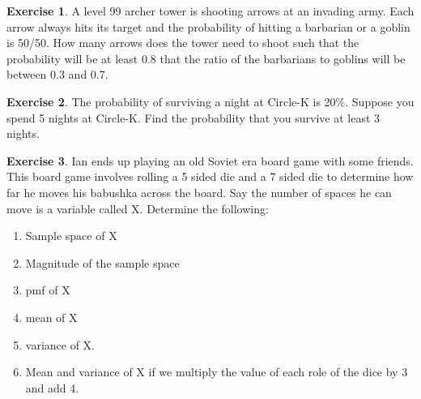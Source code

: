 \documentclass[12pt]{amsart}
\theoremstyle{definition}
\newtheorem{exercise}{Exercise}
\numberwithin{equation}{section}
\theoremstyle{plain}
\begin{document}
\begin{exercise}
A level 99 archer tower is shooting arrows at an invading army. Each arrow always hits its target and the probability of hitting a barbarian or a goblin is 50/50. How many arrows does the tower need to shoot such that the probability will be at least 0.8 that the ratio of the barbarians to goblins will be between 0.3 and 0.7.
\end{exercise}

\begin{exercise}
The probability of surviving a night at Circle-K is 20\%. Suppose you spend 5 nights at Circle-K. Find the probability that you survive at least 3 nights.
\end{exercise}

\begin{exercise}
Ian ends up playing an old Soviet era board game with some friends. This board game involves rolling a 5 sided die and a 7 sided die to determine how far he moves his babushka across the board. Say the number of spaces he can move is a variable called X. Determine the following: 
\begin{enumerate}[label=\Alph*.]
\item Sample space of X
\item Magnitude of the sample space
\item pmf of X
\item mean of X
\item variance of X.
\item Mean and variance of X if we multiply the value of each role of the dice by 3 and add 4.
\end{enumerate}
\end{exercise}
\end{document}
